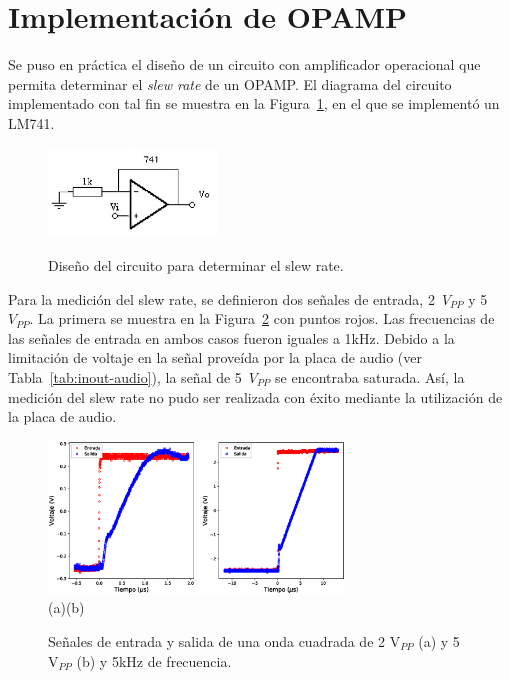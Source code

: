 \documentclass[a4paper,10pt]{article}
\begin{document}
\section{Implementación de OPAMP}
\label{sec:opamp}

Se puso en práctica el diseño de un circuito con amplificador 
operacional que permita determinar el {\it slew rate} de un
OPAMP. El diagrama del circuito implementado con tal fin se 
muestra en la Figura~\ref{fig:opamp}, en el que se implementó
un LM741.
\begin{figure}[h]
 \centering
 \includegraphics[width=0.4\textwidth]{slewratecircuit.png}
 \label{fig:opamp}
 \caption{Diseño del circuito para determinar el slew rate.}
\end{figure}
Para la medición del slew rate, se definieron dos señales de 
entrada, 2~$V_{PP}$ y 5~$V_{PP}$. La primera se muestra en la
Figura~\ref{fig:slewrate} con puntos rojos. Las frecuencias de 
las señales de entrada en ambos casos fueron iguales a 1kHz. 
Debido a la limitación de voltaje en la señal proveída por la
placa de audio (ver Tabla~\ref{tab:inout-audio}), la señal de 
5~$V_{PP}$ se encontraba saturada. Así, la medición del slew rate
no pudo ser realizada con éxito mediante la utilización de la 
placa de audio. 
\begin{figure}[H]
 \centering
 \includegraphics[width=0.7\textwidth]{slewrate.eps} \\
 \hspace{0.2cm}(a)\hspace{4.5cm}(b)
 \label{fig:slewrate}
 \caption{Señales de entrada y salida de una onda cuadrada de
 2 V$_{PP}$ (a) y 5 V$_{PP}$ (b) y 5kHz de frecuencia.}
\end{figure}
\end{document}
